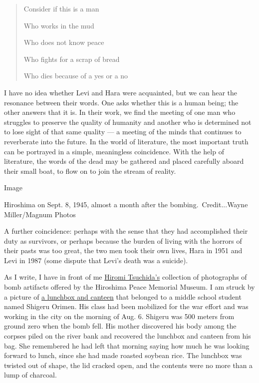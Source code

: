 \begin{quote}
Consider if this is a man

Who works in the mud

Who does not know peace

Who fights for a scrap of bread

Who dies because of a yes or a no
\end{quote}

I have no idea whether Levi and Hara were acquainted, but we can hear
the resonance between their words. One asks whether this is a human
being; the other answers that it is. In their work, we find the meeting
of one man who struggles to preserve the quality of humanity and another
who is determined not to lose sight of that same quality --- a meeting
of the minds that continues to reverberate into the future. In the world
of literature, the most important truth can be portrayed in a simple,
meaningless coincidence. With the help of literature, the words of the
dead may be gathered and placed carefully aboard their small boat, to
flow on to join the stream of reality.

Image

Hiroshima on Sept. 8, 1945, almost a month after the
bombing.~Credit...Wayne Miller/Magnum Photos

A further coincidence: perhaps with the sense that they had accomplished
their duty as survivors, or perhaps because the burden of living with
the horrors of their pasts was too great, the two men took their own
lives, Hara in 1951 and Levi in 1987 (some dispute that Levi's death was
a suicide).

As I write, I have in front of me
\href{https://ibashogallery.com/artists/76-hiromi-tsuchida/overview/}{Hiromi
Tsuchida's} collection of photographs of bomb artifacts offered by the
Hiroshima Peace Memorial Museum. I am struck by a picture of
\href{http://www.pcf.city.hiroshima.jp/virtual/VirtualMuseum_e/visit_e/vit_ex_e/vit_ex4_e.html}{a
lunchbox and canteen} that belonged to a middle school student named
Shigeru Orimen. His class had been mobilized for the war effort and was
working in the city on the morning of Aug. 6. Shigeru was 500 meters
from ground zero when the bomb fell. His mother discovered his body
among the corpses piled on the river bank and recovered the lunchbox and
canteen from his bag. She remembered he had left that morning saying how
much he was looking forward to lunch, since she had made roasted soybean
rice. The lunchbox was twisted out of shape, the lid cracked open, and
the contents were no more than a lump of charcoal.

